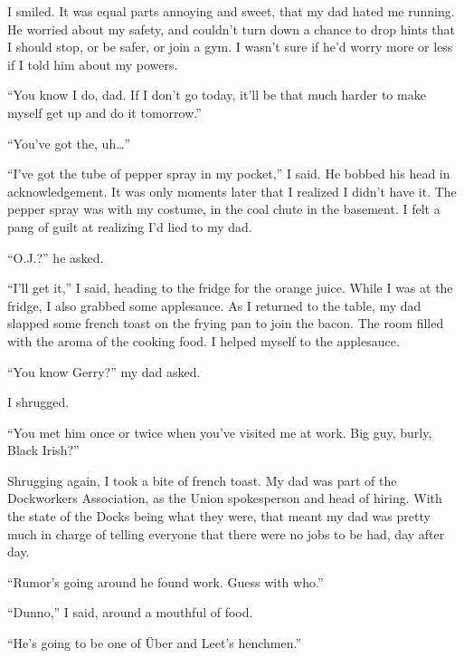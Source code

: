 I smiled.  It was equal parts annoying and sweet, that my dad hated me running.  He worried about my safety, and couldn't turn down a chance to drop hints that I should stop, or be safer, or join a gym.  I wasn't sure if he'd worry more or less if I told him about my powers.



``You know I do, dad.  If I don't go today, it'll be that much harder to make myself get up and do it tomorrow.''



``You've got the, uh\ldots''



``I've got the tube of pepper spray in my pocket,'' I said.  He bobbed his head in acknowledgement.  It was only moments later that I realized I didn't have it.  The pepper spray was with my costume, in the coal chute in the basement.  I felt a pang of guilt at realizing I'd lied to my dad.



``O.J.?'' he asked.



``I'll get it,'' I said, heading to the fridge for the orange juice.  While I was at the fridge, I also grabbed some applesauce.  As I returned to the table, my dad slapped some french toast on the frying pan to join the bacon.  The room filled with the aroma of the cooking food.  I helped myself to the applesauce.



``You know Gerry?'' my dad asked.



I shrugged.



``You met him once or twice when you've visited me at work.  Big guy, burly, Black Irish?''



Shrugging again, I took a bite of french toast.  My dad was part of the Dockworkers Association, as the Union spokesperson and head of hiring.  With the state of the Docks being what they were, that meant my dad was pretty much in charge of telling everyone that there were no jobs to be had, day after day.



``Rumor's going around he found work.  Guess with who.''



``Dunno,'' I said, around a mouthful of food.



``He's going to be one of \"{U}ber and Leet's henchmen.''



